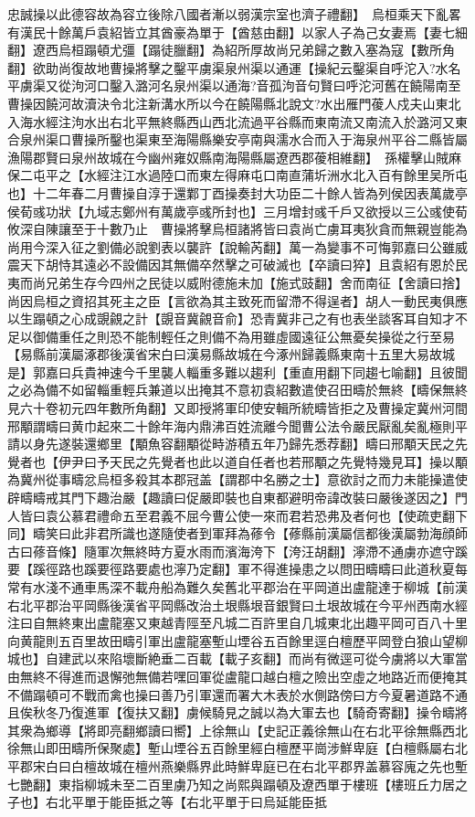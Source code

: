 忠誠操以此德容故為容立後除八國者漸以弱漢宗室也濟子禮翻】　烏桓乘天下亂畧有漢民十餘萬戶袁紹皆立其酋豪為單于【酋慈由翻】以家人子為己女妻焉【妻七細翻】遼西烏桓蹋頓尤彊【蹋徒臘翻】為紹所厚故尚兄弟歸之數入塞為寇【數所角翻】欲助尚復故地曹操將擊之鑿平虜渠泉州渠以通運【操紀云鑿渠自呼沱入?水名平虜渠又從泃河口鑿入潞河名泉州渠以通海?音孤泃音句賢曰呼沱河舊在饒陽南至曹操因饒河故瀆決令北注新溝水所以今在饒陽縣北說文?水出雁門葰人戍夫山東北入海水經注泃水出右北平無終縣西山西北流過平谷縣而東南流又南流入於潞河又東合泉州渠口曹操所鑿也渠東至海陽縣樂安亭南與濡水合而入于海泉州平谷二縣皆屬漁陽郡賢曰泉州故城在今幽州雍奴縣南海陽縣屬遼西郡葰相維翻】　孫權擊山賊麻保二屯平之【水經注江水過陸口而東左得麻屯口南直蒲圻洲水北入百有餘里吴所屯也】十二年春二月曹操自淳于還鄴丁酉操奏封大功臣二十餘人皆為列侯因表萬歲亭侯荀彧功狀【九域志鄭州有萬歲亭彧所封也】三月增封彧千戶又欲授以三公彧使荀攸深自陳讓至于十數乃止　曹操將擊烏桓諸將皆曰袁尚亡虜耳夷狄貪而無親豈能為尚用今深入征之劉備必說劉表以襲許【說輸芮翻】萬一為變事不可悔郭嘉曰公雖威震天下胡恃其遠必不設備因其無備卒然擊之可破滅也【卒讀曰猝】且袁紹有恩於民夷而尚兄弟生存今四州之民徒以威附德施未加【施式豉翻】舍而南征【舍讀曰捨】尚因烏桓之資招其死主之臣【言欲為其主致死而留滯不得逞者】胡人一動民夷俱應以生蹋頓之心成覬覦之計【覬音冀覦音俞】恐青冀非己之有也表坐談客耳自知才不足以御備重任之則恐不能制輕任之則備不為用雖虛國遠征公無憂矣操從之行至易【易縣前漢屬涿郡後漢省宋白曰漢易縣故城在今涿州歸義縣東南十五里大易故城是】郭嘉曰兵貴神速今千里襲人輜重多難以趨利【重直用翻下同趨七喻翻】且彼聞之必為備不如留輜重輕兵兼道以出掩其不意初袁紹數遣使召田疇於無終【疇保無終見六十卷初元四年數所角翻】又即授將軍印使安輯所統疇皆拒之及曹操定冀州河間邢顒謂疇曰黄巾起來二十餘年海内鼎沸百姓流離今聞曹公法令嚴民厭亂矣亂極則平請以身先遂裝還鄉里【顒魚容翻顒從畤游積五年乃歸先悉荐翻】疇曰邢顒天民之先覺者也【伊尹曰予天民之先覺者也此以道自任者也若邢顒之先覺特幾見耳】操以顒為冀州從事疇忿烏桓多殺其本郡冠盖【謂郡中名勝之士】意欲討之而力未能操遣使辟疇疇戒其門下趣治嚴【趣讀曰促嚴即裝也自東都避明帝諱改裝曰嚴後遂因之】門人皆曰袁公慕君禮命五至君義不屈今曹公使一來而君若恐弗及者何也【使疏吏翻下同】疇笑曰此非君所識也遂隨使者到軍拜為蓚令【蓚縣前漢屬信都後漢屬勃海顔師古曰蓚音條】隨軍次無終時方夏水雨而濱海洿下【洿汪胡翻】濘滯不通虜亦遮守蹊要【蹊徑路也蹊要徑路要處也濘乃定翻】軍不得進操患之以問田疇疇曰此道秋夏每常有水淺不通車馬深不載舟船為難久矣舊北平郡治在平岡道出盧龍達于柳城【前漢右北平郡治平岡縣後漢省平岡縣改治土垠縣垠音銀賢曰土垠故城在今平州西南水經注曰自無終東出盧龍塞又東越青陘至凡城二百許里自几城東北出趣平岡可百八十里向黄龍則五百里故田疇引軍出盧龍塞塹山堙谷五百餘里逕白檀歷平岡登白狼山望柳城也】自建武以來陷壞斷絶垂二百載【載子亥翻】而尚有微逕可從今虜將以大軍當由無終不得進而退懈弛無備若嘿回軍從盧龍口越白檀之險出空虛之地路近而便掩其不備蹋頓可不戰而禽也操曰善乃引軍還而署大木表於水側路傍曰方今夏暑道路不通且俟秋冬乃復進軍【復扶又翻】虜候騎見之誠以為大軍去也【騎奇寄翻】操令疇將其衆為鄉導【將即亮翻鄉讀曰嚮】上徐無山【史記正義徐無山在右北平徐無縣西北徐無山即田疇所保聚處】塹山堙谷五百餘里經白檀歷平崗涉鮮卑庭【白檀縣屬右北平郡宋白曰白檀故城在檀州燕樂縣界此時鮮卑庭已在右北平郡界盖慕容廆之先也塹七艷翻】東指柳城未至二百里虜乃知之尚熙與蹋頓及遼西單于樓班【樓班丘力居之子也】右北平單于能臣抵之等【右北平單于曰烏延能臣抵
